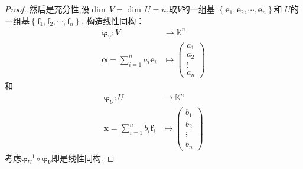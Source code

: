 {\begin{proof}
        然后是充分性,设$\dim\,V=\dim\,U=n$,取$V$的一组基
        $\left\{\bm{e}_1,\bm{e}_2,\cdots,\bm{e}_n\right\}$和
        $U$的一组基$\left\{\bm{f}_1,\bm{f}_2,\cdots,\bm{f}_n\right\}$.
        构造线性同构：
        \begin{align*}
            \bm{\varphi}_V:
            V & \longrightarrow \mathbb{K}^n \\
            \bm{\alpha} =
            \sum_{i = 1}^{n}a_i\bm{e}_i
              & \longmapsto \begin{pmatrix}
                                a_1    \\
                                a_2    \\
                                \vdots \\
                                a_n
                            \end{pmatrix}
        \end{align*}
        和
        \begin{align*}
            \bm{\varphi}_U:
            U & \longrightarrow \mathbb{K}^n \\
            \bm{x} =
            \sum_{i = 1}^{n}b_i\bm{f}_i
              & \longmapsto \begin{pmatrix}
                                b_1    \\
                                b_2    \\
                                \vdots \\
                                b_n
                            \end{pmatrix}
        \end{align*}
        考虑$\bm{\varphi}_U^{-1}\circ \bm{\varphi}_V$即是线性同构.
    \end{proof}
}
